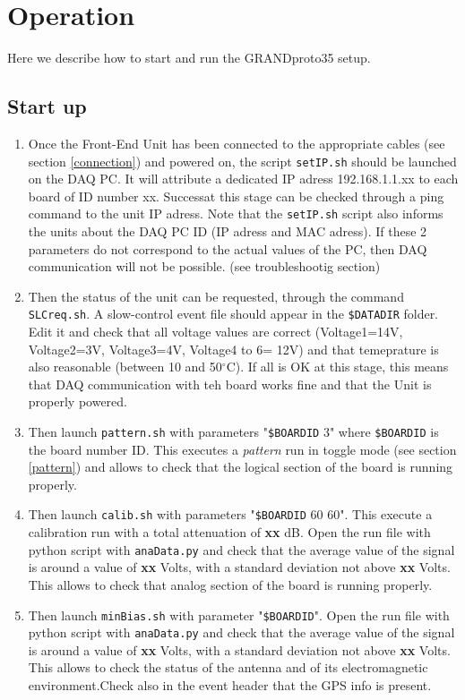 \section{Operation} 

Here we describe how to start and run the GRANDproto35 setup.

\subsection{Start up}
\begin{enumerate}[-]
\item{Once the Front-End Unit has been connected to the appropriate cables (see section \ref{connection}) and powered on, the script \texttt{setIP.sh} should be launched on the DAQ PC. It will attribute a dedicated IP adress 192.168.1.1.xx to each board of ID number xx. Successat this stage can be checked through a ping command to the unit IP adress. Note that the \texttt{setIP.sh} script also informs the units about the DAQ PC ID (IP adress and MAC adress). If these 2 parameters do not correspond to the actual values of the PC, then DAQ communication will not be possible. (see troubleshootig section)}
%
\item{Then the status of the unit can be requested, through the command \texttt{SLCreq.sh}. A slow-control event file should appear in the \texttt{\$DATADIR} folder. Edit it and check that all voltage values are correct (Voltage1=14V, Voltage2=3V, Voltage3=4V, Voltage4 to 6= 12V) and that temeprature is also reasonable (between 10 and 50$^{\circ}$C).  If all is OK at this stage, this means that DAQ communication with teh board works fine and that the Unit is properly powered.}
%
\item{Then launch \texttt{pattern.sh} with parameters "\texttt{\$BOARDID} 3" where \texttt{\$BOARDID} is the board number ID. This executes a {\it pattern} run in toggle mode (see section \ref{pattern}) and allows to check that the logical section of the board is running properly.}
%
\item{Then launch \texttt{calib.sh} with parameters "\texttt{\$BOARDID} 60 60". This execute a calibration run with a total attenuation of {\bf xx} dB. Open the run file with python script with \texttt{anaData.py} and check that the average value of the signal is around a value of {\bf xx} Volts, with a standard deviation not above {\bf xx} Volts. This allows to check that analog section of the board is running properly. }
%
\item{Then launch \texttt{minBias.sh} with parameter "\texttt{\$BOARDID}". Open the run file with python script with \texttt{anaData.py} and check that the average value of the signal is around a value of {\bf xx} Volts, with a standard deviation not above {\bf xx} Volts. This allows to check the status of the antenna and of its electromagnetic environment.Check also in the event header that the GPS info is present.}

\end{enumerate}
